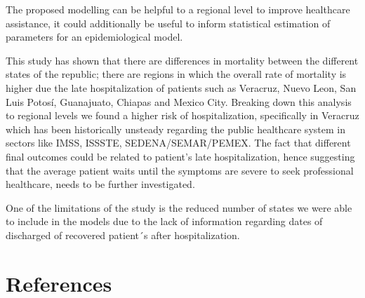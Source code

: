 \documentclass[10pt,letterpaper]{article}
\begin{document}
The proposed modelling can be helpful to a regional level to improve
healthcare assistance, it could additionally be useful to inform
statistical estimation of parameters for an epidemiological model.

This study has shown that there are differences in mortality between the
different states of the republic; there are regions in which the overall
rate of mortality is higher due the late hospitalization of patients
such as Veracruz, Nuevo Leon, San Luis Potosí, Guanajuato, Chiapas and
Mexico City. Breaking down this analysis to regional levels we found a
higher risk of hospitalization, specifically in Veracruz which has been
historically unsteady regarding the public healthcare system in sectors
like IMSS, ISSSTE, SEDENA/SEMAR/PEMEX. The fact that different final
outcomes could be related to patient's late hospitalization, hence
suggesting that the average patient waits until the symptoms are severe
to seek professional healthcare, needs to be further investigated.

One of the limitations of the study is the reduced number of states we
were able to include in the models due to the lack of information
regarding dates of discharged of recovered patient´s after
hospitalization.

\hypertarget{references}{%
\section*{References}\label{references}}
\end{document}
